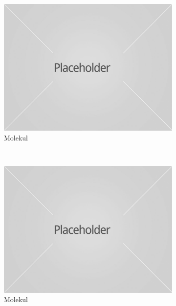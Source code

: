 \documentclass[times, utf8, diplomski]{fer}
\theoremstyle{plain}
\theoremstyle{definition}
\begin{document}
\begin{figure}[h]
\centering
\begin{subfigure}{0.3\textwidth}
\includegraphics[width=\textwidth]{placeholder}
\caption{Molekul}
\end{subfigure}
~
\begin{subfigure}{0.3\textwidth}
\includegraphics[width=\textwidth]{placeholder}
\caption{Molekul}
\end{subfigure}
~
\begin{subfigure}{0.3\textwidth}

\end{subfigure}
\end{figure}
\end{document}
